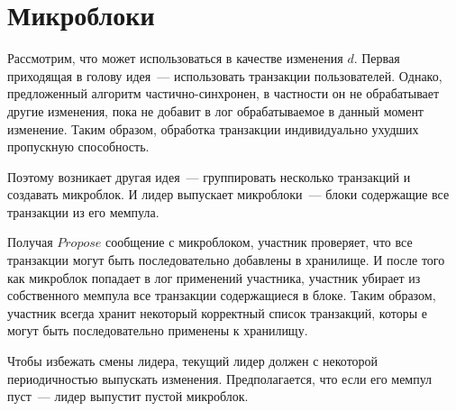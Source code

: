 \section{Микроблоки}
Рассмотрим, что может использоваться в качестве изменения $d$. Первая приходящая в голову идея~--- использовать транзакции пользователей. Однако, предложенный алгоритм частично-синхронен, в частности он не обрабатывает другие изменения, пока не добавит в лог обрабатываемое в данный момент изменение. Таким образом, обработка транзакции индивидуально ухудших пропускную способность.

Поэтому возникает другая идея~--- группировать несколько транзакций и создавать микроблок. И лидер выпускает микроблоки~--- блоки содержащие все транзакции из его мемпула. 

Получая $Propose$ сообщение с микроблоком, участник проверяет, что все транзакции могут быть последовательно добавлены в хранилище.
И после того как микроблок попадает в лог применений участника, участник убирает из собственного мемпула все транзакции содержащиеся в блоке. Таким образом, участник всегда хранит некоторый корректный список транзакций, которы	е могут быть последовательно применены к хранилищу.

Чтобы избежать смены лидера, текущий лидер должен с некоторой периодичностью выпускать изменения. Предполагается, что если его мемпул пуст~--- лидер выпустит пустой микроблок.


